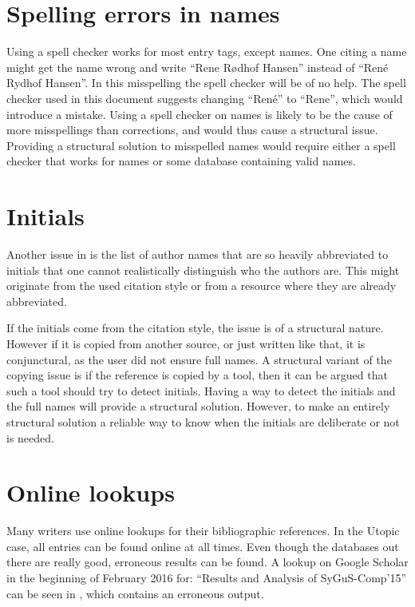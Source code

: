 \section{Spelling errors in names}
\label{sec:problems_spelling_names}

Using a spell checker works for most entry tags, except names.  One
citing a name might get the name wrong and write ``Rene Rødhof
Hansen'' instead of ``René Rydhof Hansen''.  In this misspelling the
spell checker will be of no help.  The spell checker used in this
document suggests changing ``René'' to ``Rene'', which would introduce
a mistake.  Using a spell checker on names is likely to be the cause
of more misspellings than corrections, and would thus cause a
structural issue.  Providing a structural solution to misspelled names
would require either a spell checker that works for names or some
database containing valid names.


\section{Initials}
\label{sec:problems_initials}

Another issue in  is the list of author
names that are so heavily abbreviated to initials that one cannot
realistically distinguish who the authors are.  This might originate
from the used citation style or from a resource where they are already
abbreviated.

If the initials come from the citation style, the issue is of a
structural nature.  However if it is copied from another source, or
just written like that, it is conjunctural, as the user did not ensure
full names.  A structural variant of the copying issue is if the
reference is copied by a tool, then it can be argued that such a tool
should try to detect initials.  Having a way to detect the initials
and the full names will provide a structural solution.  However, to
make an entirely structural solution a reliable way to know when the
initials are deliberate or not is needed.


\section{Online lookups}
\label{sec:problems_look_ups}

Many writers use online lookups for their bibliographic references.
In the Utopic case, all entries can be found online at all times.
Even though the databases out there are really good, erroneous results
can be found.  A lookup on Google Scholar in the beginning of February
2016 for: ``Results and Analysis of SyGuS-Comp’15'' can be seen in
, which contains an erroneous output.

